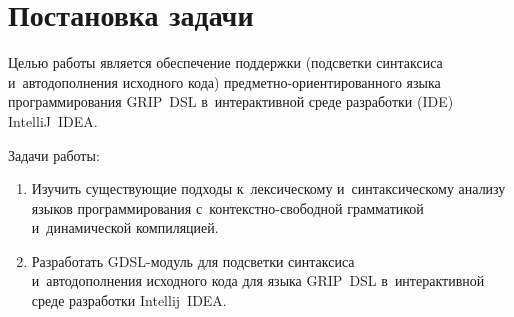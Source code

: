 \section{Постановка задачи} \label{sub21}

Целью работы является обеспечение поддержки (подсветки синтаксиса и~автодополнения исходного кода) предметно-ориентированного языка программирования GRIP~DSL в~интерактивной среде разработки (IDE) IntelliJ~IDEA.

Задачи работы: 

\begin{enumerate} 
\item{Изучить существующие подходы к~лексическому и~синтаксическому анализу языков программирования с~контекстно-свободной грамматикой и~динамической компиляцией.}	
\item{Разработать GDSL-модуль для подсветки синтаксиса \\ и~автодополнения исходного кода для языка GRIP~DSL в~интерактивной среде разработки Intellij~IDEA.}
\end{enumerate} 

